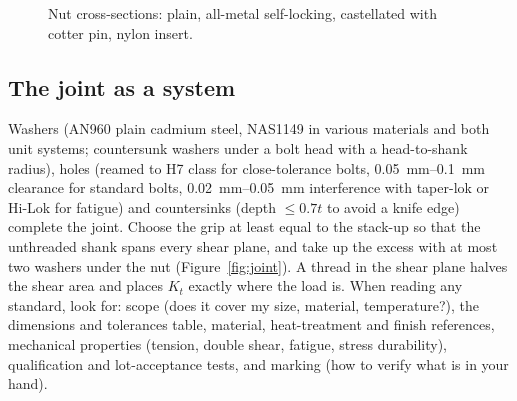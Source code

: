 \documentclass[11pt,a4paper]{article}
\begin{document}
\begin{figure}[H]
\caption{Nut cross-sections: plain, all-metal self-locking, castellated with cotter pin, nylon insert.}\label{fig:nuts}
\end{figure}


\subsection{The joint as a system}\label{sec:joint}
Washers (AN960 plain cadmium steel, NAS1149 in various materials and both unit systems; countersunk washers under a bolt head with a head-to-shank radius), holes (reamed to H7 class for close-tolerance bolts, \SIrange{0.05}{0.1}{mm} clearance for standard bolts, \SIrange{0.02}{0.05}{mm} interference with taper-lok or Hi-Lok for fatigue) and countersinks (depth $\le 0.7t$ to avoid a knife edge) complete the joint. Choose the grip at least equal to the stack-up so that the unthreaded shank spans every shear plane, and take up the excess with at most two washers under the nut (Figure~\ref{fig:joint}). A thread in the shear plane halves the shear area and places $K_t$ exactly where the load is. When reading any standard, look for: scope (does it cover my size, material, temperature?), the dimensions and tolerances table, material, heat-treatment and finish references, mechanical properties (tension, double shear, fatigue, stress durability), qualification and lot-acceptance tests, and marking (how to verify what is in your hand).
\end{document}
